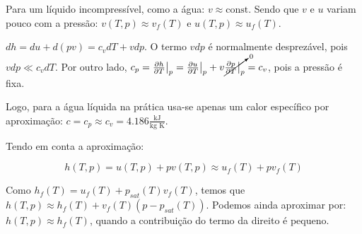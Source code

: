 Para um líquido incompressível, como a água: $v \approx \text{const}$. Sendo que $v$ e $u$ variam pouco com a pressão: $v(T,p) \approx v_f(T)$ e $u(T,p) \approx u_f(T)$.

$dh = du + d(pv) = c_v dT + v dp$. O termo $v dp$ é normalmente desprezável, pois $v dp \ll c_v dT$. Por outro lado, $c_p = \frac{\partial h}{\partial T} \bigr|_{p} = \frac{\partial u}{\partial T}\bigr|_{p} + v \cancelto{0}{\frac{\partial p}{\partial T}\bigr|_{p}} = c_v$, pois a pressão é fixa.

Logo, para a água líquida na prática usa-se apenas um calor específico por aproximação: $c = c_p \approx c_v = 4.186 \frac{\text{kJ}}{\text{kg K}} $.

Tendo em conta a aproximação:

\begin{equation}
    h(T, p) = u(T,p) + p v(T,p) \approx u_f(T) + p v_f(T)
\end{equation}


Como $h_f(T) = u_f(T) + p_{sat}(T) v_f(T)$, temos que $h(T, p) \approx h_f(T) + v_f(T) (p - p_{sat}(T))$. Podemos ainda aproximar por: $h(T,p) \approx h_f(T)$, quando a contribuição do termo da direito é pequeno.

